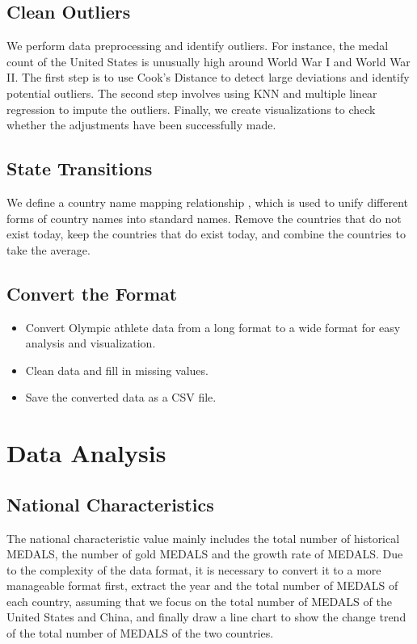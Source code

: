 \documentclass{mcmthesis}
\begin{document}
    \subsection{Clean Outliers}
    We perform data preprocessing and identify outliers. For instance, the medal count of the United States is unusually high around World War I and World War II. The first step is to use Cook’s Distance to detect large deviations and identify potential outliers. The second step involves using KNN and multiple linear regression to impute the outliers. Finally, we create visualizations to check whether the adjustments have been successfully made.
    \subsection{State Transitions}
We define a country name mapping relationship , which is used to unify different forms of country names into standard names. Remove the countries that do not exist today, keep the countries that do exist today, and combine the countries to take the average.
\subsection{Convert the Format}
\begin{itemize}
  \item Convert Olympic athlete data from a long format to a wide format for easy analysis and visualization.
  \item Clean data and fill in missing values.
  \item Save the converted data as a CSV file.
  \end{itemize}

  \section{Data Analysis}
  \subsection{National Characteristics}
  The national characteristic value mainly includes the total number of historical MEDALS, the number of gold MEDALS and the growth rate of MEDALS.
  Due to the complexity of the data format, it is necessary to convert it to a more manageable format first, extract the year and the total number of MEDALS of each country, assuming that we focus on the total number of MEDALS of the United States and China, and finally draw a line chart to show the change trend of the total number of MEDALS of the two countries.
\end{document}

